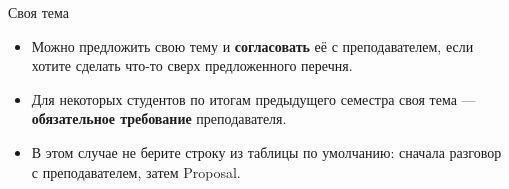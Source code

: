 \begin{frame}{Своя тема}

  \medskip
  \begin{itemize}\setlength\itemsep{0.45em}
    \item Можно предложить свою тему и \textbf{согласовать} её с преподавателем,
          если хотите сделать что-то сверх предложенного перечня.
    \item Для некоторых студентов по итогам предыдущего семестра
          своя тема --- \textbf{обязательное требование} преподавателя.
    \item В этом случае не берите строку из таблицы \flqq по умолчанию\frqq:
          сначала разговор с преподавателем, затем Proposal.
  \end{itemize}
\end{frame}
